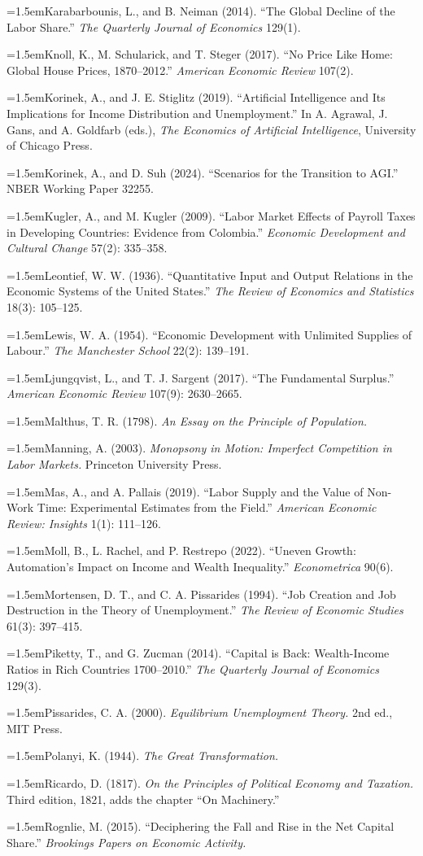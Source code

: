 \documentclass[12pt]{article}
\theoremstyle{plain}
\newcommand{\refentry}[1]{\par\hangindent=1.5em\hangafter=1\noindent #1}
\begin{document}
{\refentry{Karabarbounis, L., and B. Neiman (2014). ``The Global Decline of the Labor Share.'' \emph{The Quarterly Journal of Economics} 129(1).}
\refentry{Knoll, K., M. Schularick, and T. Steger (2017). ``No Price Like Home: Global House Prices, 1870--2012.'' \emph{American Economic Review} 107(2).}
\refentry{Korinek, A., and J. E. Stiglitz (2019). ``Artificial Intelligence and Its Implications for Income Distribution and Unemployment.'' In A. Agrawal, J. Gans, and A. Goldfarb (eds.), \emph{The Economics of Artificial Intelligence}, University of Chicago Press.}
\refentry{Korinek, A., and D. Suh (2024). ``Scenarios for the Transition to AGI.'' NBER Working Paper 32255.}
\refentry{Kugler, A., and M. Kugler (2009). ``Labor Market Effects of Payroll Taxes in Developing Countries: Evidence from Colombia.'' \emph{Economic Development and Cultural Change} 57(2): 335--358.}
\refentry{Leontief, W. W. (1936). ``Quantitative Input and Output Relations in the Economic Systems of the United States.'' \emph{The Review of Economics and Statistics} 18(3): 105--125.}
\refentry{Lewis, W. A. (1954). ``Economic Development with Unlimited Supplies of Labour.'' \emph{The Manchester School} 22(2): 139--191.}
\refentry{Ljungqvist, L., and T. J. Sargent (2017). ``The Fundamental Surplus.'' \emph{American Economic Review} 107(9): 2630--2665.}
\refentry{Malthus, T. R. (1798). \emph{An Essay on the Principle of Population.}}
\refentry{Manning, A. (2003). \emph{Monopsony in Motion: Imperfect Competition in Labor Markets.} Princeton University Press.}
\refentry{Mas, A., and A. Pallais (2019). ``Labor Supply and the Value of Non-Work Time: Experimental Estimates from the Field.'' \emph{American Economic Review: Insights} 1(1): 111--126.}
\refentry{Moll, B., L. Rachel, and P. Restrepo (2022). ``Uneven Growth: Automation's Impact on Income and Wealth Inequality.'' \emph{Econometrica} 90(6).}
\refentry{Mortensen, D. T., and C. A. Pissarides (1994). ``Job Creation and Job Destruction in the Theory of Unemployment.'' \emph{The Review of Economic Studies} 61(3): 397--415.}
\refentry{Piketty, T., and G. Zucman (2014). ``Capital is Back: Wealth-Income Ratios in Rich Countries 1700--2010.'' \emph{The Quarterly Journal of Economics} 129(3).}
\refentry{Pissarides, C. A. (2000). \emph{Equilibrium Unemployment Theory.} 2nd ed., MIT Press.}
\refentry{Polanyi, K. (1944). \emph{The Great Transformation.}}
\refentry{Ricardo, D. (1817). \emph{On the Principles of Political Economy and Taxation.} Third edition, 1821, adds the chapter ``On Machinery.''}
\refentry{Rognlie, M. (2015). ``Deciphering the Fall and Rise in the Net Capital Share.'' \emph{Brookings Papers on Economic Activity.}}
}
\end{document}

